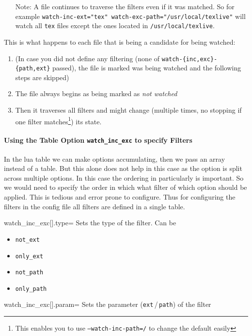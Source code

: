 \documentclass[a4paper, 11pt]{scrartcl}
\begin{document}
\begin{itemize}
	\item[Note:] A file continues to traverse the filters even if it was matched.
		So for example \texttt{watch-inc-ext="tex" watch-exc-path="/usr/local/texlive"} will watch all \texttt{tex} files except the ones located in \texttt{/usr/local/texlive}.
\end{itemize}

This is what happens to each file that is being a candidate for being watched:
\begin{enumerate}
	\item (In case you did not define any filtering (none of \texttt{watch-\{inc,exc\}-\{path,ext\}} passed), the file is marked was being watched and the following steps are skipped)
	\item The file always begins as being marked as \emph{not watched}
	\item Then it traverses all filters and might change (multiple times, no stopping if one filter matches\footnote{
		This enables you to use \texttt{--watch-inc-path=/} to change the default easily
	}) its state.
\end{enumerate}

\paragraph{Using the Table Option \texttt{watch\_inc\_exc} to specify Filters}
In the lua table we can make options accumulating, then we pass an array instead of a table.
But this alone does not help in this case as the option is split across multiple options.
In this case the ordering in particularly is important.
So we would need to specify the order in which what filter of which option should be applied.
This is tedious and error prone to configure.
Thus for configuring the filters in the config file all filters are defined in a single table.

\begin{docKey}[config][
	]{watch_inc_exc[].type}{=}{}
	Sets the type of the filter. Can be
	\begin{multicols}{4}
		\begin{itemize}
			\item \texttt{not\_ext}
			\item \texttt{only\_ext}
			\item \texttt{not\_path}
			\item \texttt{only\_path}
		\end{itemize}
	\end{multicols}
\end{docKey}
\begin{docKey}[config][
	]{watch_inc_exc[].param}{=}{}
	Sets the parameter (\texttt{ext}\,/\,\texttt{path}) of the filter
\end{docKey}
\end{document}
